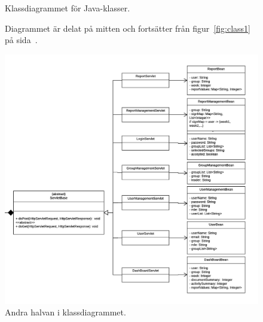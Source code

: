 \documentclass[paper=a4, fontsize=11pt,twoside]{article}
\begin{document}
\begin{center} 
\begin{figure}[H]
\centering
\centerline{Klassdiagrammet för Java-klasser.}
\centerline{Diagrammet är delat på mitten och fortsätter från figur~\ref{fig:class1} på sida~\pageref{fig:class1}.}
\includegraphics[width=14cm]{Klassdiagram2}%
\caption{Andra halvan i klassdiagrammet.\label{fig:class2}}
\end{figure}
\end{center} 
\end{document}
